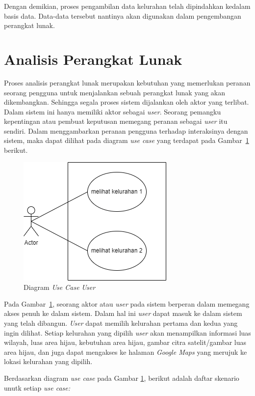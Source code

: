 Dengan demikian, proses pengambilan data kelurahan telah dipindahkan kedalam basis data. Data-data tersebut nantinya akan digunakan dalam pengembangan perangkat lunak.  


\section{Analisis Perangkat Lunak}
Proses analisis perangkat lunak merupakan kebutuhan yang memerlukan peranan seorang pengguna untuk menjalankan sebuah perangkat lunak yang akan dikembangkan. Sehingga segala proses sistem dijalankan oleh aktor yang terlibat. Dalam sistem ini hanya memiliki aktor sebagai \textit{user}. Seorang pemangku kepentingan atau pembuat keputusan memegang peranan sebagai \textit{user} itu sendiri. Dalam menggambarkan peranan pengguna terhadap interaksinya dengan sistem, maka dapat dilihat pada diagram \textit{use case} yang terdapat pada Gambar~\ref{fig:useCaseUser} berikut.

\begin{figure}[H]
	\centering
	\includegraphics[scale=0.8]{Gambar/usecasediagram.png}
	\caption[Diagram \textit{Use Case} \textit{User}]{Diagram \textit{Use Case} \textit{User}}
	\label{fig:useCaseUser}
\end{figure}

Pada Gambar~\ref{fig:useCaseUser}, seorang aktor atau \textit{user} pada sistem berperan dalam memegang akses penuh ke dalam sistem. Dalam hal ini \textit{user} dapat masuk ke dalam sistem yang telah dibangun. \textit{User} dapat memilih kelurahan pertama dan kedua yang ingin dilihat. Setiap kelurahan yang dipilih \textit{user} akan menampilkan informasi luas wilayah, luas area hijau, kebutuhan area hijau, gambar citra satelit/gambar luas area hijau, dan juga dapat mengakses ke halaman \textit{Google Maps} yang merujuk ke lokasi kelurahan yang dipilih.
	
Berdasarkan diagram \textit{use case }pada Gambar \ref{fig:useCaseUser}, berikut adalah daftar skenario unutk setiap \textit{use case:}	

